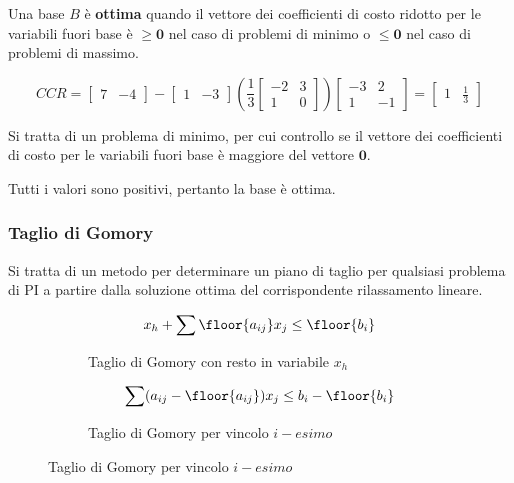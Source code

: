 \documentclass[\main/main.tex]{subfiles}
\begin{document}
\begin{definition}
  Una base $B$ è \textbf{ottima} quando il vettore dei coefficienti di costo ridotto per le variabili fuori base è $\geq \bm{0}$ nel caso di problemi di minimo o $\leq \bm{0}$ nel caso di problemi di massimo.
\end{definition}

\[
  CCR = \begin{bmatrix}
    7 & -4
  \end{bmatrix}
  -
  \begin{bmatrix}
    1 & -3
  \end{bmatrix}
  \left(
  \frac{1}{3}
  \begin{bmatrix}
    -2 & 3 \\
    1  & 0
  \end{bmatrix}
  \right)
  \begin{bmatrix}
    -3 & 2  \\
    1  & -1
  \end{bmatrix}
  = \begin{bmatrix}
    1 & \frac{1}{3}
  \end{bmatrix}
\]

Si tratta di un problema di minimo, per cui controllo se il vettore dei coefficienti di costo per le variabili fuori base è maggiore del vettore $\bm{0}$.

Tutti i valori sono positivi, pertanto la base è ottima.

\subsubsection*{Taglio di Gomory}

\begin{definition}
  Si tratta di un metodo per determinare un piano di taglio per qualsiasi problema di PI a partire dalla soluzione ottima del corrispondente rilassamento lineare.

  \begin{figure}
    \begin{subfigure}{0.49\textwidth}
      \[
        x_h + \sum \floor{a_{ij}}x_j \leq \floor{b_i}
      \]
      \caption{Taglio di Gomory con resto in variabile $x_h$}
      \label{gomory_cut_formula_general}
    \end{subfigure}
    \begin{subfigure}{0.49\textwidth}
      \[
        \sum (a_{ij} - \floor{a_{ij}})x_j \leq b_i-\floor{b_i}
      \]
      \caption{Taglio di Gomory per vincolo $i-esimo$}
      \label{gomory_cut_formula}
    \end{subfigure}
  \end{figure}
\end{definition}
\end{document}
